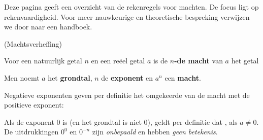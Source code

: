\documentclass{ximera}
\begin{document}
	\author{Wiskundeplan}

Deze pagina geeft een overzicht van de rekenregels voor machten. 
De focus ligt op rekenvaardigheid. Voor meer nauwkeurige en theoretische bespreking verwijzen we door naar een handboek. 


\begin{definition}(Machtsverheffing) \label{def:machten_light}\label{def:machten met gehele exponent}\
    
        
    
    Voor een natuurlijk getal $n$ en een reëel getal $a$ is de \textbf{$n$-de macht} van $a$ het getal
    
    Men noemt $a$ het \textbf{grondtal},  $n$ de \textbf{exponent} en $a^n$  een \textbf{macht}.
            
    Negatieve exponenten geven per definitie het omgekeerde van de macht met de positieve exponent:
    
    
    Als de exponent 0 is (en het grondtal is niet 0), geldt per definitie dat  , als $a\neq0$.
    \\
    De uitdrukkingen $0^0$ en $0^{-n}$ zijn \textit{onbepaald} en hebben \textit{geen betekenis}.

\end{definition}
\end{document}
